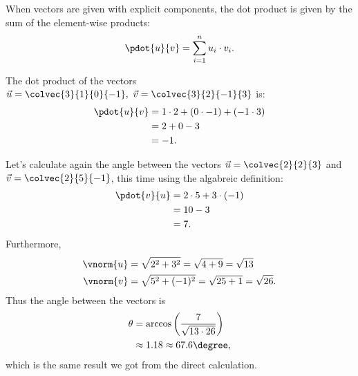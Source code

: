 When vectors are given with explicit components, the dot product is given by the sum of the element-wise products:
\begin{equation*}
  \pdot{u}{v} = \sum\limits_{i=1}^{n} u_{i}\cdot v_{i}.
\end{equation*}

\begin{example}
  
  The dot product of the vectors $\vec{u} = \colvec{3}{1}{0}{-1},\ \vec{v} = \colvec{3}{2}{-1}{3}$ is:
  \begin{align*}
  \pdot{u}{v} &= 1\cdot2 + (0\cdot-1) + (-1\cdot3)\\
  &= 2+0-3\\
  &= -1.
  \end{align*}
\end{example}

\begin{example}
  
  Let's calculate again the angle between the vectors $\vec{u}=\colvec{2}{2}{3}$ and $\vec{v}=\colvec{2}{5}{-1}$, this time using the algabreic definition:
  \begin{align*}
  \pdot{v}{u} &= 2\cdot5 + 3\cdot(-1)\\
  &= 10 - 3\\
  &= 7.
  \end{align*}
  Furthermore,
  \begin{align*}
  \vnorm{u} &= \sqrt{2^{2}+3^{2}} = \sqrt{4+9} = \sqrt{13}\\
  \vnorm{v} &= \sqrt{5^{2}+(-1)^{2}} = \sqrt{25+1} = \sqrt{26}.
  \end{align*}
  Thus the angle between the vectors is
  \begin{align*}
  \theta &= \arccos\left(\frac{7}{\sqrt{13\cdot 26}}\right)\\
  &\approx 1.18 \approx 67.6\degree,
  \end{align*}
  which is the same result we got from the direct calculation.
\end{example}

